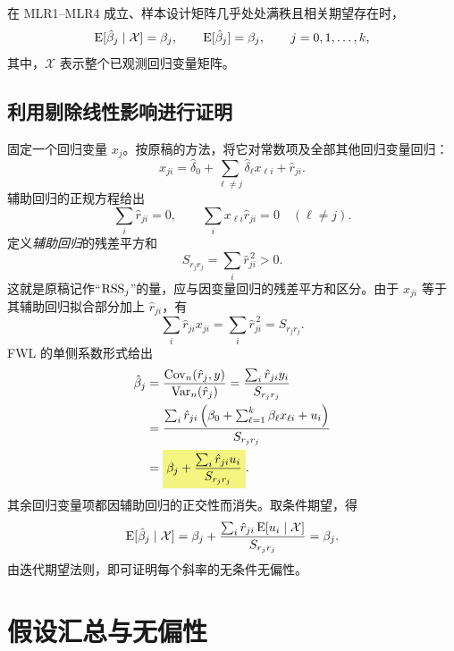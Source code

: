 \begin{theorem}\label{thm:multiple-unbiased}
在 MLR1--MLR4 成立、样本设计矩阵几乎处处满秩且相关期望存在时，
\[\operatorname{E}[\hat\beta_j\mid\mathcal X]=\beta_j,
\qquad\operatorname{E}[\hat\beta_j]=\beta_j,\qquad j=0,1,\ldots,k,\]
其中，$\mathcal X$ 表示整个已观测回归变量矩阵。
\end{theorem}

\subsection{利用剔除线性影响进行证明}
\label{sec:fwl-week4}
固定一个回归变量 $x_j$。按原稿的方法，将它对常数项及全部其他回归变量回归：
\begin{equation}\label{eq:auxiliary-j}
x_{ji}=\hat\delta_0+\sum_{\ell\ne j}\hat\delta_\ell x_{\ell i}+\hat r_{ji}.
\end{equation}
辅助回归的正规方程给出
\[\sum_i\hat r_{ji}=0,\qquad
\sum_i x_{\ell i}\hat r_{ji}=0\quad(\ell\ne j).\]
定义\emph{辅助回归}的残差平方和
\[S_{r_jr_j}=\sum_i\hat r_{ji}^{\,2}>0.
\]
这就是原稿记作“$\operatorname{RSS}_j$”的量，应与因变量回归的残差平方和区分。由于 $x_{ji}$ 等于其辅助回归拟合部分加上 $\hat r_{ji}$，有
\[\sum_i\hat r_{ji}x_{ji}=\sum_i\hat r_{ji}^{\,2}=S_{r_jr_j}.
\]
FWL 的单侧系数形式给出
\begin{align}
\hat\beta_j
&=\frac{\Cov_n(\hat r_j,y)}{\Var_n(\hat r_j)}
=\frac{\sum_i\hat r_{ji}y_i}{S_{r_jr_j}}\notag\\
&=\frac{\sum_i\hat r_{ji}\left(\beta_0+\sum_{\ell=1}^k\beta_\ell x_{\ell i}+u_i\right)}{S_{r_jr_j}}\notag\\
&=\hm{\beta_j+\frac{\sum_i\hat r_{ji}u_i}{S_{r_jr_j}}}.\label{eq:multiple-slope-error}
\end{align}
其余回归变量项都因辅助回归的正交性而消失。取条件期望，得
\[\operatorname{E}[\hat\beta_j\mid\mathcal X]
=\beta_j+\frac{\sum_i\hat r_{ji}\operatorname{E}[u_i\mid\mathcal X]}{S_{r_jr_j}}
=\beta_j.\]
由迭代期望法则，即可证明每个斜率的无条件无偏性。

\section{假设汇总与无偏性}
\label{sec:assumptions-summary}
